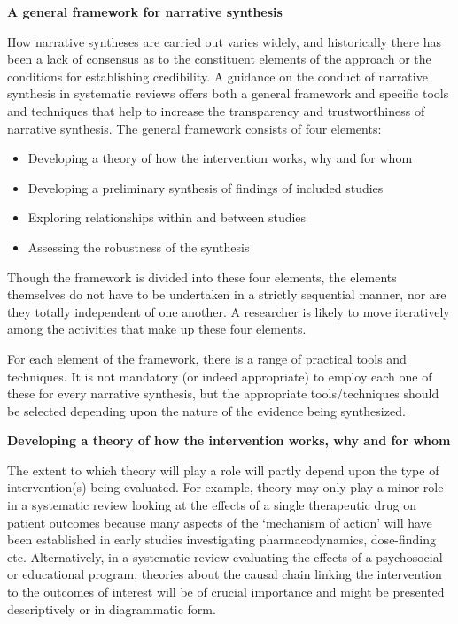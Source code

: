 \documentclass[
  10pt,
  a4paper,
  DIV=11,
  numbers=noendperiod]{scrreprt}
\begin{document}
\textbf{A general framework for narrative synthesis}

How narrative syntheses are carried out varies widely, and historically
there has been a lack of consensus as to the constituent elements of the
approach or the conditions for establishing credibility. A guidance on
the conduct of narrative synthesis in systematic reviews offers both a
general framework and specific tools and techniques that help to
increase the transparency and trustworthiness of narrative synthesis.
The general framework consists of four elements:

\begin{itemize}
\item
  Developing a theory of how the intervention works, why and for whom
\item
  Developing a preliminary synthesis of findings of included studies
\item
  Exploring relationships within and between studies
\item
  Assessing the robustness of the synthesis
\end{itemize}

Though the framework is divided into these four elements, the elements
themselves do not have to be undertaken in a strictly sequential manner,
nor are they totally independent of one another. A researcher is likely
to move iteratively among the activities that make up these four
elements.

For each element of the framework, there is a range of practical tools
and techniques. It is not mandatory (or indeed appropriate) to employ
each one of these for every narrative synthesis, but the appropriate
tools/techniques should be selected depending upon the nature of the
evidence being synthesized.

\textbf{Developing a theory of how the intervention works, why and for
whom}

The extent to which theory will play a role will partly depend upon the
type of intervention(s) being evaluated. For example, theory may only
play a minor role in a systematic review looking at the effects of a
single therapeutic drug on patient outcomes because many aspects of the
`mechanism of action' will have been established in early studies
investigating pharmacodynamics, dose-finding etc. Alternatively, in a
systematic review evaluating the effects of a psychosocial or
educational program, theories about the causal chain linking the
intervention to the outcomes of interest will be of crucial importance
and might be presented descriptively or in diagrammatic form.
\end{document}

